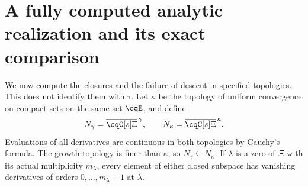 \section{A fully computed analytic realization and its exact comparison}
\label{sec:cq-analytic}
We now compute the closures and the failure of descent in specified
topologies. This does not identify them with $\tau$.
Let $\kappa$ be the topology of uniform convergence on compact sets
on the same set $\cqE$, and define
\[
 N_\gamma=\overline{\cqC[s]\Xi}^{\,\gamma},\qquad
 N_\kappa=\overline{\cqC[s]\Xi}^{\,\kappa}.
\]
Evaluations of all derivatives are continuous in both topologies by
Cauchy's formula. The growth topology is finer than $\kappa$, so
$N_\gamma\subseteq N_\kappa$.
If $\lambda$ is a zero of $\Xi$ with its actual multiplicity $m_\lambda$,
every element of either closed subspace has vanishing derivatives
of orders $0,\ldots,m_\lambda-1$ at $\lambda$.


